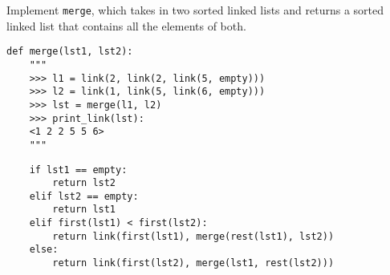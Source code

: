 \begin{blocksection}
\question Implement \lstinline$merge$, which takes in two sorted linked lists and returns a sorted linked list that contains all the elements of both.

\begin{lstlisting}
def merge(lst1, lst2):
    """
    >>> l1 = link(2, link(2, link(5, empty)))
    >>> l2 = link(1, link(5, link(6, empty)))
    >>> lst = merge(l1, l2)
    >>> print_link(lst):
    <1 2 2 5 5 6>
    """
\end{lstlisting}

\begin{solution}[1.5in]
\begin{lstlisting}
    if lst1 == empty:
        return lst2
    elif lst2 == empty:
        return lst1
    elif first(lst1) < first(lst2):
        return link(first(lst1), merge(rest(lst1), lst2))
    else:
        return link(first(lst2), merge(lst1, rest(lst2)))
\end{lstlisting}
\end{solution}
\end{blocksection}